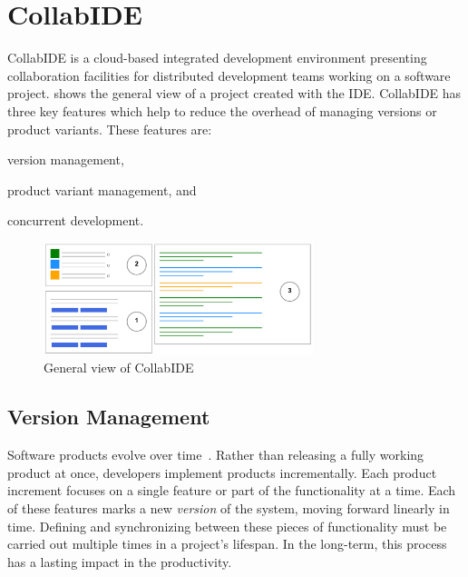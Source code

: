 
\section{CollabIDE}
\label{sec:collab-ide}

CollabIDE is a cloud-based integrated development environment presenting collaboration facilities 
for distributed development teams working on a software project.  shows the 
general view of a project created with the IDE. 
CollabIDE has three key features which help to reduce the overhead of managing versions or product variants. These features are:
\begin{enumerate*}[label=(\arabic*)] 
\item version management, 
\item product variant management, and 
\item concurrent development.
\end{enumerate*}

\begin{figure}[tbp]
  \centering
  \includegraphics[width=0.7\textwidth]{img/collabIDEGeneral}
  \caption{General view of CollabIDE}
  \label{fig:general-view}
\end{figure}

\subsection{Version Management}
\label{sec:vcs}
Software products evolve over time~\cite{lehman02}. Rather than releasing a fully working product at 
once, developers implement products incrementally. Each product increment focuses on a single 
feature or part of the functionality at a time. Each of these features marks a new \emph{version} of the 
system, moving forward linearly in time. Defining and synchronizing between these pieces of 
functionality must be carried out multiple times in a project's lifespan. In the long-term, this process 
has a lasting impact in the productivity.

